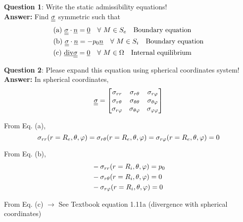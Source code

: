 
\noindent \textbf{Question 1}: Write the static admissibility equations! \\

\textbf{Answer:} Find $\underline{\underline{\sigma}} $ symmetric such that 
\begin{equation}
\begin{split}
& \text{(a)  } \underline{\underline{\sigma}} \cdot \underline{n} = \underline{0} \quad \forall \text{ } M \in S_e \quad \text{Boundary equation} \\
& \text{(b)  } \underline{\underline{\sigma}} \cdot \underline{n} = - p_0 \underline{n} \quad \forall \text{ } M \in S_i \quad \text{Boundary equation} \\
& \text{(c)  } \text{\underline{div}} \underline{\underline{\sigma}} = \underline{0} \quad \forall \text{ } M \in \Omega \quad \text{Internal equilibrium}
\end{split}
\end{equation}

\noindent \textbf{Question 2}: Please expand this equation using spherical  coordinates system! \\

\textbf{Answer:} In spherical coordinates,
\begin{equation}
\underline{\underline{\sigma}} = \left[
\begin{matrix}
\sigma_{rr} & \sigma_{r\theta} & \sigma_{r\varphi} \\
\sigma_{r\theta} & \sigma_{\theta\theta} & \sigma_{\theta \varphi} \\
\sigma_{r\varphi} & \sigma_{\theta \varphi} & \sigma_{\varphi\varphi} 
\end{matrix}
\right]
\end{equation}

From Eq. (a),
\begin{equation}
\sigma_{rr}(r = R_e,\theta,\varphi) = \sigma_{r\theta} (r=R_e,\theta,\varphi) = \sigma_{r\varphi}(r=R_e,\theta,\varphi) = 0
\end{equation}

From Eq. (b),
\begin{equation}
\begin{split}
& -\sigma_{rr}(r=R_i,\theta,\varphi) = p_0 \\
& -\sigma_{r\theta}(r=R_i,\theta,\varphi) = 0 \\
& -\sigma_{r\varphi}(r=R_i,\theta,\varphi) = 0
\end{split}
\end{equation}

From Eq. (c) $\rightarrow$ See Textbook equation 1.11a (divergence with spherical coordinates)



